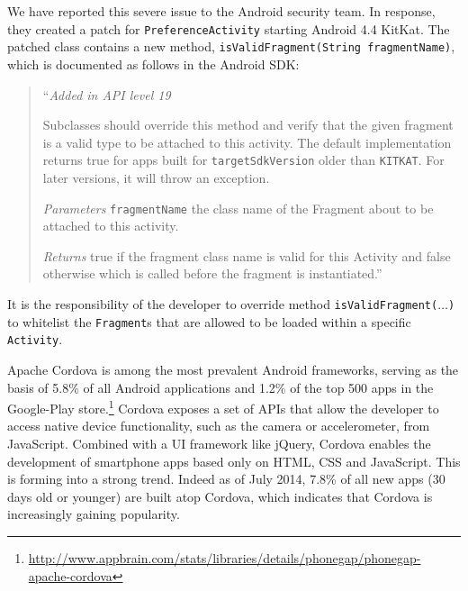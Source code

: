 We have reported this severe issue to the Android security team. In response, they
created a patch for \texttt{PreferenceActivity} starting Android 4.4 KitKat. 
The patched class contains a new method, \texttt{isValidFragment(String fragmentName)}, 
which is documented as follows in the Android SDK:
\begin{quote}
	``\textit{Added in API level 19}
	
	Subclasses should override this method and verify that the given fragment
	is a valid type to be attached to this activity. The default implementation
	returns true for apps built for \texttt{targetSdkVersion}
	older than \texttt{KITKAT}. For later versions, it will throw an exception.
	
	\textit{Parameters} \texttt{fragmentName} the class name of the Fragment
	about to be attached to this activity. 
	
	\textit{Returns} true if the fragment class name is valid for this
	Activity and false otherwise which is called before the fragment is
	instantiated.'' 
\end{quote}
It is the responsibility of the developer to override method {\tt isValidFragment($\ldots$)} to whitelist the {\tt Fragment}s that are allowed to be loaded within a specific
{\tt Activity}.

\label{Se:CordovaXAS}

Apache Cordova is among the most prevalent Android frameworks, serving as the basis of 5.8\% of all Android applications and 1.2\% of the top 500 apps in the Google-Play store.\footnote{\url{http://www.appbrain.com/stats/libraries/details/phonegap/phonegap-apache-cordova}} Cordova exposes a set of APIs that allow the developer to access native device functionality, such as the camera or accelerometer, from JavaScript. Combined with a UI framework like jQuery, Cordova enables the development of smartphone apps based only
on HTML, CSS and JavaScript. This is forming into a strong trend. Indeed as of July 2014, 7.8\% of all new apps (30 days old or younger) are built atop Cordova, which indicates that Cordova is increasingly gaining popularity.

